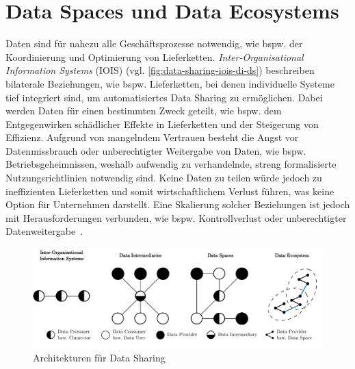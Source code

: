 
\section{Data Spaces und Data Ecosystems}

Daten sind für nahezu alle Geschäftsprozesse notwendig, wie bspw. der Koordinierung und Optimierung von Lieferketten.
\emph{Inter-Organisational Information Systems} (IOIS) (vgl. \autoref{fig:data-sharing-iois-di-ds}) beschreiben bilaterale Beziehungen, wie bspw. Lieferketten, bei denen individuelle Systeme tief integriert sind, um automatisiertes Data Sharing zu ermöglichen.
Dabei werden Daten für einen bestimmten Zweck geteilt, wie bspw. dem Entgegenwirken schädlicher Effekte in Lieferketten und der Steigerung von Effizienz.
Aufgrund von mangelndem Vertrauen besteht die Angst vor Datenmissbrauch oder unberechtigter Weitergabe von Daten, wie bspw. Betriebsgeheimnissen, weshalb aufwendig zu verhandelnde, streng formalisierte Nutzungsrichtlinien notwendig sind.
Keine Daten zu teilen würde jedoch zu ineffizienten Lieferketten und somit wirtschaftlichem Verlust führen, was keine Option für Unternehmen darstellt.
Eine Skalierung solcher Beziehungen ist jedoch mit Herausforderungen verbunden, wie bspw. Kontrollverlust oder unberechtigter Datenweitergabe~\cite{mollerIndustrialDataEcosystems2024}.

\begin{figure}
    \includegraphics[width=\textwidth]{./assets/data_sharing_architectures.drawio.pdf}
    \caption{Architekturen für Data Sharing~\cite[vgl.][]{mollerIndustrialDataEcosystems2024}}
    \label{fig:data-sharing-iois-di-ds}
\end{figure}

